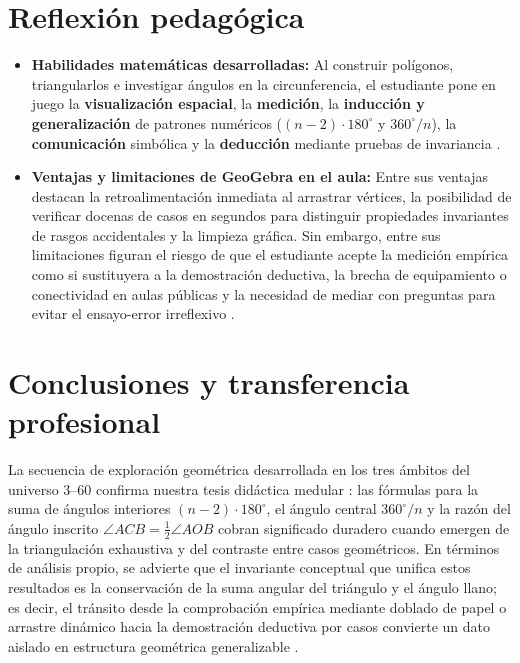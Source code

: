\documentclass[spanish,letterpaper,oneside]{article}
\begin{document}
\section{Reflexión pedagógica}
\begin{itemize}
  \item \textbf{Habilidades matemáticas desarrolladas:} Al construir polígonos, triangularlos e investigar ángulos en la circunferencia, el estudiante pone en juego la \textbf{visualización espacial}, la \textbf{medición}, la \textbf{inducción y generalización} de patrones numéricos ($(n-2)\cdot 180^\circ$ y $360^\circ/n$), la \textbf{comunicación} simbólica y la \textbf{deducción} mediante pruebas de invariancia \citep{vandewalle2019,sep2024_fase6}.
  \item \textbf{Ventajas y limitaciones de GeoGebra en el aula:} Entre sus ventajas destacan la retroalimentación inmediata al arrastrar vértices, la posibilidad de verificar docenas de casos en segundos para distinguir propiedades invariantes de rasgos accidentales y la limpieza gráfica. Sin embargo, entre sus limitaciones figuran el riesgo de que el estudiante acepte la medición empírica como si sustituyera a la demostración deductiva, la brecha de equipamiento o conectividad en aulas públicas y la necesidad de mediar con preguntas para evitar el ensayo-error irreflexivo \citep{duval2006}.
\end{itemize}

\clearpage
\section{Conclusiones y transferencia profesional}
La secuencia de exploración geométrica desarrollada en los tres ámbitos del universo $3\text{--}60$ confirma nuestra tesis didáctica medular \citep{iiiepe2026_s10,euclides_elementos}: las fórmulas para la suma de ángulos interiores $(n-2)\cdot 180^\circ$, el ángulo central $360^\circ/n$ y la razón del ángulo inscrito $\angle ACB = \frac{1}{2}\angle AOB$ cobran significado duradero cuando emergen de la triangulación exhaustiva y del contraste entre casos geométricos. En términos de análisis propio, se advierte que el invariante conceptual que unifica estos resultados es la conservación de la suma angular del triángulo y el ángulo llano; es decir, el tránsito desde la comprobación empírica mediante doblado de papel o arrastre dinámico hacia la demostración deductiva por casos convierte un dato aislado en estructura geométrica generalizable \citep{duval2006,vandewalle2019}.
\end{document}
